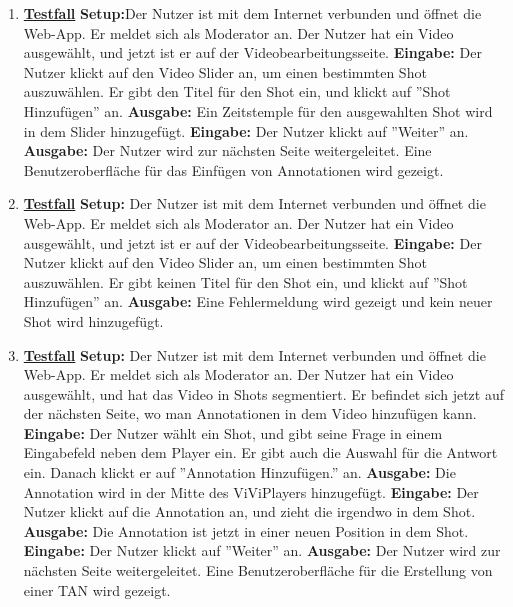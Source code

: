 \begin{enumerate}
	\item \underline{\textbf{Testfall}} \linebreak
	\textbf{Setup:}Der Nutzer ist mit dem Internet verbunden und öffnet die Web-App. Er meldet sich als Moderator an. Der Nutzer hat ein Video ausgewählt, und jetzt ist er auf der Videobearbeitungsseite.\linebreak
	\textbf{Eingabe:} Der Nutzer klickt auf den Video Slider an, um einen bestimmten Shot auszuwählen. Er gibt den Titel für den Shot ein, und klickt auf ''Shot Hinzufügen'' an. \linebreak
	\textbf{Ausgabe:} Ein Zeitstemple für den ausgewahlten Shot wird in dem Slider hinzugefügt.\linebreak
	\textbf{Eingabe:} Der Nutzer klickt auf ''Weiter'' an. \linebreak
	\textbf{Ausgabe:} Der Nutzer wird zur nächsten Seite weitergeleitet. Eine Benutzeroberfläche für das Einfügen von Annotationen wird gezeigt.
	
	\item \underline{\textbf{Testfall}} \linebreak
	\textbf{Setup:} Der Nutzer ist mit dem Internet verbunden und öffnet die Web-App. Er meldet sich als Moderator an. Der Nutzer hat ein Video ausgewählt, und jetzt ist er auf der Videobearbeitungsseite.\linebreak
	\textbf{Eingabe:} Der Nutzer klickt auf den Video Slider an, um einen bestimmten Shot auszuwählen. Er gibt keinen Titel für den Shot ein, und klickt auf ''Shot Hinzufügen'' an. \linebreak
	\textbf{Ausgabe:} Eine Fehlermeldung wird gezeigt und kein neuer Shot wird hinzugefügt.
	
	\item \underline{\textbf{Testfall}} \linebreak
	\textbf{Setup:} Der Nutzer ist mit dem Internet verbunden und öffnet die Web-App. Er meldet sich als Moderator an. Der Nutzer hat ein Video ausgewählt, und hat das Video in Shots segmentiert. Er befindet sich jetzt auf der nächsten Seite, wo man Annotationen in dem Video hinzufügen kann.\linebreak
	\textbf{Eingabe:} Der Nutzer wählt ein Shot, und gibt seine Frage in einem Eingabefeld neben dem Player ein. Er gibt auch die Auswahl für die Antwort ein. Danach klickt er auf ''Annotation Hinzufügen.'' an.\linebreak
	\textbf{Ausgabe:} Die Annotation wird in der Mitte des ViViPlayers hinzugefügt.\linebreak
	\textbf{Eingabe:} Der Nutzer klickt auf die Annotation an, und zieht die irgendwo in dem Shot.\linebreak
	\textbf{Ausgabe:} Die Annotation ist jetzt in einer neuen Position in dem Shot.\linebreak
	\textbf{Eingabe:} Der Nutzer klickt auf ''Weiter'' an. \linebreak
	\textbf{Ausgabe:} Der Nutzer wird zur nächsten Seite weitergeleitet. Eine Benutzeroberfläche für die Erstellung von einer TAN wird gezeigt.
	

\end{enumerate}

